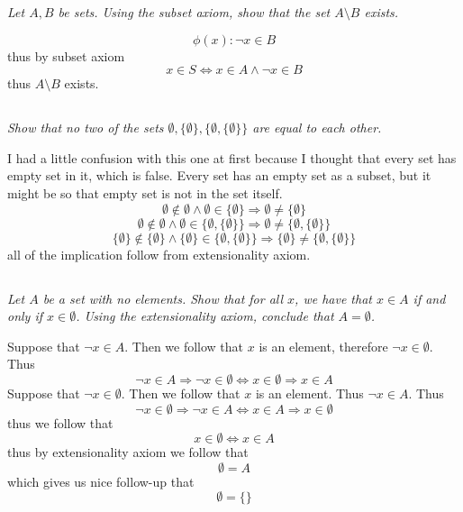 \documentclass[11pt,oneside,titlepage]{book}
\DeclareMathOperator \lra {\Leftrightarrow}
\DeclareMathOperator \imp {\Rightarrow}
\begin{document}
\textit{Let $A, B$ be sets. Using the subset axiom, show that the set $A \setminus B$ exists.}

$$\phi(x): \neg x \in B$$
thus by subset axiom
$$x \in S \lra x \in A \land \neg x \in B$$
thus $A \setminus B$ exists.

\subsection{}

\textit{Show that no two of the sets $\emptyset, \{\emptyset\}, \{\emptyset, \{\emptyset\}\}$
  are equal to each other.}

I had a little confusion with this one at first because I thought that every set has
empty set in it, which is false. Every set has an empty set as a subset, but it
might be so that empty set is not in the set itself.
$$\emptyset \notin \emptyset \land \emptyset \in \{\emptyset\} \imp \emptyset \neq \{\emptyset\}$$
$$\emptyset \notin \emptyset \land \emptyset \in \{\emptyset, \{\emptyset\}\} \imp
\emptyset \neq \{\emptyset, \{\emptyset\}\}$$
$$\{\emptyset\} \notin \{\emptyset\} \land \{\emptyset\} \in \{\emptyset, \{\emptyset\}\} \imp
\{\emptyset\} \neq \{\emptyset, \{\emptyset\}\}$$
all of the implication follow from extensionality axiom.

\subsection{}

\textit{Let $A$ be a set with no elements. Show that for all $x$, we have that $x \in A$ if
  and only if $x \in \emptyset$. Using the extensionality axiom, conclude that $A = \emptyset$.}

Suppose that $\neg x \in A$. Then we follow that $x$ is an element, therefore $\neg x \in \emptyset$.
Thus
$$\neg x \in A \imp \neg x \in \emptyset \iff x \in \emptyset \imp x \in A$$
Suppose that $\neg x \in \emptyset$. Then we follow that $x$ is an element. Thus $\neg x \in A$.
Thus
$$\neg x \in \emptyset \imp \neg x \in A \iff x \in A \imp x \in  \emptyset$$
thus we follow that
$$x \in \emptyset \lra x \in A$$
thus by extensionality axiom we follow that
$$\emptyset = A$$
which gives us nice follow-up that
$$\emptyset = \{\}$$

\subsection{}
\end{document}
